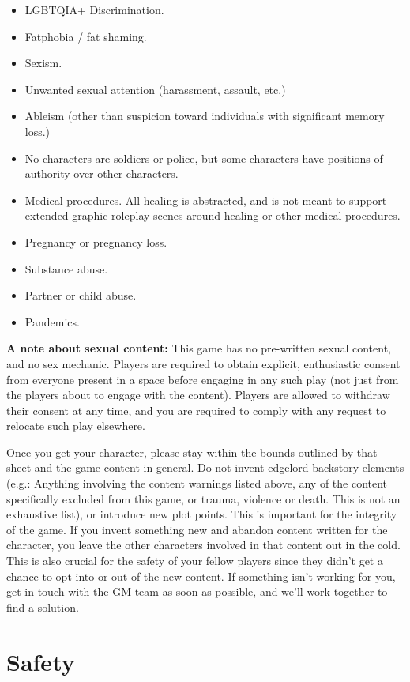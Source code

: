 \documentclass[sheet]{GL2020}
\begin{document}
\begin{multicols}{2}
\begin{itemize}
 	\item LGBTQIA+ Discrimination.
	\item Fatphobia / fat shaming.
	\item Sexism.
	\item Unwanted sexual attention (harassment, assault, etc.)
	\item Ableism (other than suspicion toward individuals with significant memory loss.)
	\item No characters are soldiers or police, but some characters have positions of authority over other characters.
	\item Medical procedures. All healing is abstracted, and is not meant to support extended graphic roleplay scenes around healing or other medical procedures.
	\item Pregnancy or pregnancy loss.
	\item Substance abuse.
	\item Partner or child abuse.
	\item Pandemics.
\end{itemize}
\end{multicols}

\textbf{A note about sexual content:} This game has no pre-written sexual content, and no sex mechanic. Players are required to obtain explicit, enthusiastic consent from everyone present in a space before engaging in any such play (not just from the players about to engage with the content). Players are allowed to withdraw their consent at any time, and you are required to comply with any request to relocate such play elsewhere.

Once you get your character, please stay within the bounds outlined by that sheet and the game content in general. Do not invent edgelord backstory elements (e.g.: Anything involving the content warnings listed above, any of the content specifically excluded from this game, or trauma, violence or death. This is not an exhaustive list), or introduce new plot points. This is important for the integrity of the game. If you invent something new and abandon content written for the character, you leave the other characters involved in that content out in the cold. This is also crucial for the safety of your fellow players since they didn't get a chance to opt into or out of the new content. If something isn't working for you, get in touch with the GM team as soon as possible, and we'll work together to find a solution.

\section{Safety}
\end{document}
